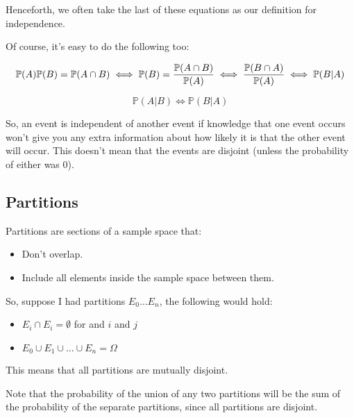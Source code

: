 Henceforth, we often take the last of these equations as our definition for
independence.

Of course, it's easy to do the following too:

\begin{dmath*}
	{\mathbb{P}(A)\mathbb{P}(B) = \mathbb{P}(A \cap B)} \iff {\mathbb{P}(B) = \frac{\mathbb{P}(A \cap B)}{\mathbb{P}(A)}} \iff {\frac{\mathbb{P}(B \cap A)}{\mathbb{P}(A)}} \iff {\mathbb{P}(B|A)}\\	
\end{dmath*}

\begin{dmath*}
	{\mathbb{P}(A|B) \iff \mathbb{P}(B|A)}
\end{dmath*}

So, an event is independent of another event if knowledge that one event occurs
won't give you any extra information about how likely it is that the other event
will occur. This doesn't mean that the events are disjoint (unless the
probability of either was $0$).

\subsection{Partitions}

Partitions are sections of a sample space that:

\begin{itemize}
	\item Don't overlap.
	\item Include all elements inside the sample space between them.
\end{itemize}

So, suppose I had partitions $E_0 \dots E_n$, the following would hold:

\begin{itemize}
	\item $E_i \cap E_i = \emptyset$ for and $i$ and $j$
	\item $E_0 \cup E_1 \cup \dots \cup E_n = \Omega$
\end{itemize}

This means that all partitions are mutually disjoint.


Note that the probability of the union of any two partitions will be the sum of
the probability of the separate partitions, since all partitions are disjoint.

